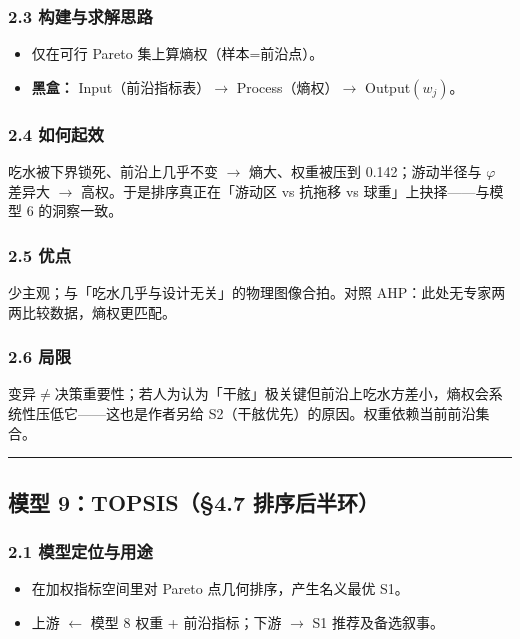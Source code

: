 \documentclass[UTF8,a4paper,zihao=-4]{ctexart}
\begin{document}
\subsubsection{\texorpdfstring{2.3 构建与求解思路}{2.3 构建与求解思路}}
\begin{itemize}[leftmargin=1.5em]
\item 仅在可行 Pareto 集上算熵权（样本=前沿点）。
\item \textbf{黑盒：} Input（前沿指标表）$\rightarrow$ Process（熵权）$\rightarrow$ Output\((w_j)\)。
\end{itemize}

\subsubsection{\texorpdfstring{2.4 如何起效}{2.4 如何起效}}
吃水被下界锁死、前沿上几乎不变 $\rightarrow$ 熵大、权重被压到 0.142；游动半径与 \(\varphi\) 差异大 $\rightarrow$ 高权。于是排序真正在「游动区 vs 抗拖移 vs 球重」上抉择------与模型 6 的洞察一致。

\subsubsection{\texorpdfstring{2.5 优点}{2.5 优点}}
少主观；与「吃水几乎与设计无关」的物理图像合拍。对照 AHP：此处无专家两两比较数据，熵权更匹配。

\subsubsection{\texorpdfstring{2.6 局限}{2.6 局限}}
变异$\ne$决策重要性；若人为认为「干舷」极关键但前沿上吃水方差小，熵权会系统性压低它------这也是作者另给 S2（干舷优先）的原因。权重依赖当前前沿集合。

\vspace{0.4em}\hrule\vspace{0.4em}

\subsection{\texorpdfstring{模型 9：TOPSIS（§4.7 排序后半环）}{模型 9：TOPSIS（§4.7 排序后半环）}}

\subsubsection{\texorpdfstring{2.1 模型定位与用途}{2.1 模型定位与用途}}
\begin{itemize}[leftmargin=1.5em]
\item 在加权指标空间里对 Pareto 点几何排序，产生名义最优 S1。
\item 上游 $\leftarrow$ 模型 8 权重 + 前沿指标；下游 $\rightarrow$ S1 推荐及备选叙事。
\end{itemize}
\end{document}
